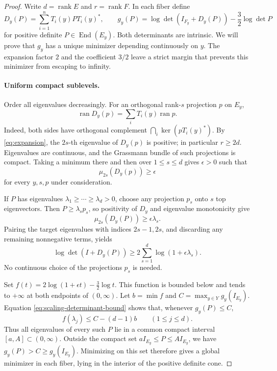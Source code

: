 \begin{proof}
Write $d=\operatorname{rank}E$ and $r=\operatorname{rank}F$.  In each
fiber define
\[
  D_y(P)=\sum_{i=1}^nT_i(y)P T_i(y)^*,
  \qquad
  g_y(P)=\log\det(I_{F_y}+D_y(P))-\frac32\log\det P
\]
for positive definite $P\in\operatorname{End}(E_y)$.  Both determinants
are intrinsic.  We will prove that $g_y$ has a unique minimizer depending
continuously on $y$.  The expansion factor $2$ and the coefficient
$3/2$ leave a strict margin that prevents this minimizer from escaping
to infinity.

\paragraph{Uniform compact sublevels.}
Order all eigenvalues decreasingly.  For an orthogonal rank-$s$
projection $p$ on $E_y$,
\[
  \operatorname{ran}D_y(p)=\sum_iT_i(y)\operatorname{ran}p.
\]
Indeed, both sides have orthogonal complement
$\bigcap_i\ker(pT_i(y)^*)$.  By \eqref{eq:expansion}, the $2s$-th
eigenvalue of $D_y(p)$ is positive; in particular $r\geq2d$.
Eigenvalues are continuous, and the Grassmann bundle of such projections
is compact.  Taking a minimum there and then over $1\leq s\leq d$ gives
$\epsilon>0$ such that
\[
  \mu_{2s}(D_y(p))\geq\epsilon
\]
for every $y,s,p$ under consideration.

If $P$ has eigenvalues $\lambda_1\geq\cdots\geq\lambda_d>0$, choose any
projection $p_s$ onto $s$ top eigenvectors.  Then $P\geq\lambda_s p_s$,
so positivity of $D_y$ and eigenvalue monotonicity give
\[
  \mu_{2s}(D_y(P))\geq\epsilon\lambda_s.
\]
Pairing the target eigenvalues with indices $2s-1,2s$, and discarding any
remaining nonnegative terms, yields
\begin{equation}
  \log\det(I+D_y(P))
  \geq2\sum_{s=1}^d\log(1+\epsilon\lambda_s).
  \label{eq:scaling-determinant-bound}
\end{equation}
No continuous choice of the projections $p_s$ is needed.

Set $f(t)=2\log(1+\epsilon t)-\frac32\log t$.  This function is bounded
below and tends to $+\infty$ at both endpoints of $(0,\infty)$.  Let
$b=\min f$ and $C=\max_{y\in Y}g_y(I_{E_y})$.  Equation
\eqref{eq:scaling-determinant-bound} shows that, whenever $g_y(P)\leq C$,
\[
  f(\lambda_j)\leq C-(d-1)b\qquad(1\leq j\leq d).
\]
Thus all eigenvalues of every such $P$ lie in a common compact interval
$[a,A]\subset(0,\infty)$.  Outside the compact set
$aI_{E_y}\leq P\leq AI_{E_y}$, we have
$g_y(P)>C\geq g_y(I_{E_y})$.  Minimizing on this set therefore gives a
global minimizer in each fiber, lying in the interior of the positive
definite cone.


\end{proof}
